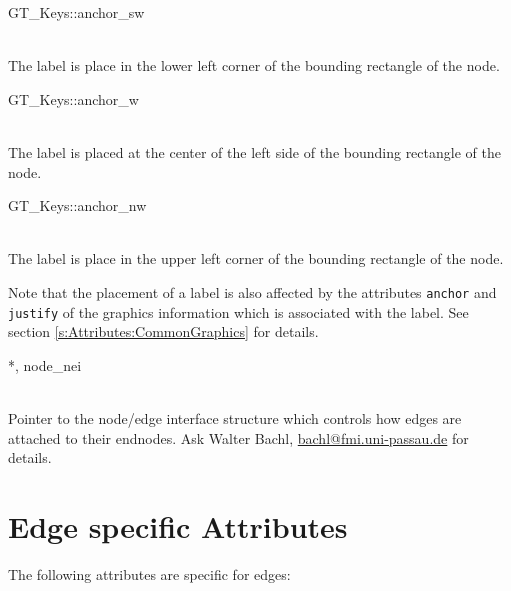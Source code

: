 \documentclass[twoside,fleqn]{report}
\begin{document}
\begin{CAttributes}
\begin{ttdescription}
    \item[GT\_Keys::anchor\_sw] \strut\\
    The label is place in the lower left corner of the bounding 
    rectangle of the node.

    \item[GT\_Keys::anchor\_w] \strut\\
    The label is placed at the center of the left side of the 
    bounding rectangle of the node.

    \item[GT\_Keys::anchor\_nw] \strut\\
    The label is place in the upper left corner of the bounding 
    rectangle of the node.
    
  \end{ttdescription}

  \begin{notes}
    \item Note that the placement of a label is also affected by
    the attributes \texttt{anchor} and \texttt{justify} of the
    graphics information which is associated with the label. See
    section \ref{s:Attributes:CommonGraphics} for details.
  \end{notes}
  
  \item[\GT{Node\_NEI}*, node\_nei] \strut\\
  Pointer to the node/edge interface structure which controls how
  edges are attached to their endnodes. Ask Walter Bachl,
  \url{bachl@fmi.uni-passau.de} for details.

\end{CAttributes}



%
%

\section{Edge specific Attributes}
\label{s:Attributes:Edge}

The following attributes are specific for edges:
\end{document}
